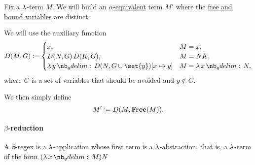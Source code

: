 \begin{algorithm}\label{alg:alpha_equivalent_term_with_distinct_variables}
  Fix a \( \mathrm{\lambda} \)-term \( M \). We will build an \hyperref[def:untyped_lambda_term_alpha_equivalence]{\( \alpha \)-equivalent} term \( M' \) where the \hyperref[def:lambda_variable_freeness]{free and bound variables} are distinct.

  We will use the auxiliary function
  \begin{equation*}
    D(M, G) \coloneqq \begin{cases}
      x,                                          &M = x, \\
      D(N, G) \thinspace D(K, G),                 &M = NK, \\
      \qabs y D(N, G \cup \set{ y })[x \mapsto y] &M = \qabs x N,
    \end{cases}
  \end{equation*}
  where \( G \) is a set of variables that should be avoided and \( y \not\in G \).

  We then simply define
  \begin{equation*}
    M' \coloneqq D(M, \op*{Free}(M)).
  \end{equation*}
\end{algorithm}

\paragraph{\( \beta \)-reduction}

\begin{definition}\label{def:beta_redex}
  A \( \beta \)-regex is a \( \mathrm{\lambda} \)-application whose first term is a \( \mathrm{\lambda} \)-abstraction, that is, a \( \mathrm{\lambda} \)-term of the form \( (\qabs x M) N \)
\end{definition}
